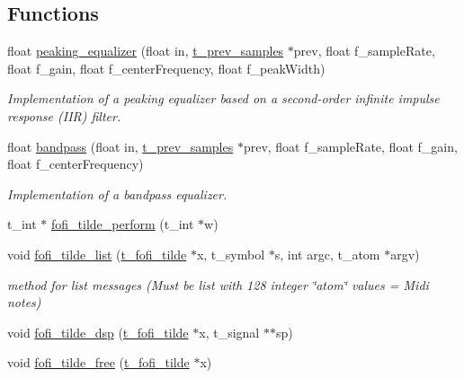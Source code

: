 \subsection*{Functions}
\begin{DoxyCompactItemize}
\item 
float \mbox{\hyperlink{fofi~_8h_aa9833aa2762cf257e25d13fb21b004b0}{peaking\+\_\+equalizer}} (float in, \mbox{\hyperlink{fofi~_8h_a728138bbe23514a1927f1f686090cd52}{t\+\_\+prev\+\_\+samples}} $\ast$prev, float f\+\_\+sample\+Rate, float f\+\_\+gain, float f\+\_\+center\+Frequency, float f\+\_\+peak\+Width)
\begin{DoxyCompactList}\small\item\em Implementation of a peaking equalizer based on a second-\/order infinite impulse response (I\+IR) filter. \end{DoxyCompactList}\item 
float \mbox{\hyperlink{fofi~_8h_a79bf4da8324cab6a31c4439c746821d8}{bandpass}} (float in, \mbox{\hyperlink{fofi~_8h_a728138bbe23514a1927f1f686090cd52}{t\+\_\+prev\+\_\+samples}} $\ast$prev, float f\+\_\+sample\+Rate, float f\+\_\+gain, float f\+\_\+center\+Frequency)
\begin{DoxyCompactList}\small\item\em Implementation of a bandpass equalizer. \end{DoxyCompactList}\item 
t\+\_\+int $\ast$ \mbox{\hyperlink{fofi~_8h_addff81b941469be60d263c2df0493f50}{fofi\+\_\+tilde\+\_\+perform}} (t\+\_\+int $\ast$w)
\item 
void \mbox{\hyperlink{fofi~_8h_a83449b8d535886ef9d7ecd42146932c3}{fofi\+\_\+tilde\+\_\+list}} (\mbox{\hyperlink{fofi~_8h_a9d4d0a864b5185ebc589d41112da08ce}{t\+\_\+fofi\+\_\+tilde}} $\ast$x, t\+\_\+symbol $\ast$s, int argc, t\+\_\+atom $\ast$argv)
\begin{DoxyCompactList}\small\item\em method for list messages (Must be list with 128 integer \char`\"{}atom\char`\"{} values = Midi notes) \end{DoxyCompactList}\item 
void \mbox{\hyperlink{fofi~_8h_aff2a8eab6867563a3613be7a34908bb2}{fofi\+\_\+tilde\+\_\+dsp}} (\mbox{\hyperlink{fofi~_8h_a9d4d0a864b5185ebc589d41112da08ce}{t\+\_\+fofi\+\_\+tilde}} $\ast$x, t\+\_\+signal $\ast$$\ast$sp)
\item 
void \mbox{\hyperlink{fofi~_8h_a5e4884d6f16289cbd823f619ca55c44a}{fofi\+\_\+tilde\+\_\+free}} (\mbox{\hyperlink{fofi~_8h_a9d4d0a864b5185ebc589d41112da08ce}{t\+\_\+fofi\+\_\+tilde}} $\ast$x)
$$
\end{DoxyCompactItemize}
